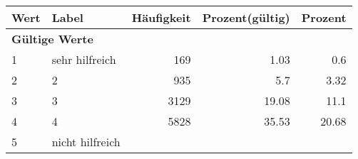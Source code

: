      \begin{longtable}{lXrrr}
     \toprule
     \textbf{Wert} & \textbf{Label} & \textbf{Häufigkeit} & \textbf{Prozent(gültig)} & \textbf{Prozent} \\
     \endhead
     \midrule
     \multicolumn{5}{l}{\textbf{Gültige Werte}}\\

     1 &
     \multicolumn{1}{X}{ sehr hilfreich   } &


       \num{169} &
       \num[round-mode=places,round-precision=2]{1,03} &
         \num[round-mode=places,round-precision=2]{0,6} \\

     2 &
     \multicolumn{1}{X}{ 2   } &


       \num{935} &
       \num[round-mode=places,round-precision=2]{5,7} &
         \num[round-mode=places,round-precision=2]{3,32} \\

     3 &
     \multicolumn{1}{X}{ 3   } &


       \num{3129} &
       \num[round-mode=places,round-precision=2]{19,08} &
         \num[round-mode=places,round-precision=2]{11,1} \\

     4 &
     \multicolumn{1}{X}{ 4   } &


       \num{5828} &
       \num[round-mode=places,round-precision=2]{35,53} &
         \num[round-mode=places,round-precision=2]{20,68} \\

     5 &
     \multicolumn{1}{X}{ nicht hilfreich   } &



\end{longtable}
